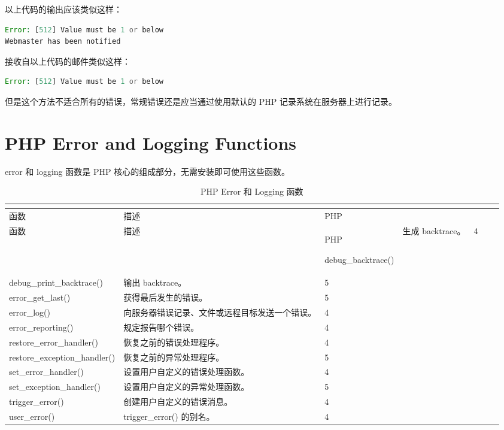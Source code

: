 以上代码的输出应该类似这样：

\begin{lstlisting}[language=PHP]
Error: [512] Value must be 1 or below
Webmaster has been notified
\end{lstlisting}


接收自以上代码的邮件类似这样：

\begin{lstlisting}[language=PHP]
Error: [512] Value must be 1 or below
\end{lstlisting}


但是这个方法不适合所有的错误，常规错误还是应当通过使用默认的 PHP 记录系统在服务器上进行记录。



\section{PHP Error and Logging Functions}

error 和 logging 函数是 PHP 核心的组成部分，无需安装即可使用这些函数。



\begin{longtable}{|m{120pt}|m{250pt}|m{20pt}|}
\tabularnewline\hline
函数	&描述	&PHP
\endhead

\caption{PHP Error 和 Logging 函数}\\
\hline
函数	&描述	&PHP
\endfirsthead

\endfoot

\endlastfoot

\hline
debug\_backtrace()			&生成 backtrace。	&4\\
\hline
debug\_print\_backtrace()	&输出 backtrace。	&5\\
\hline
error\_get\_last()			&获得最后发生的错误。&	5\\
\hline
error\_log()					&向服务器错误记录、文件或远程目标发送一个错误。	&4\\
\hline
error\_reporting()			&规定报告哪个错误。	&4\\
\hline
restore\_error\_handler()	&恢复之前的错误处理程序。	&4\\
\hline
restore\_exception\_handler()&	恢复之前的异常处理程序。	&5\\
\hline
set\_error\_handler()		&设置用户自定义的错误处理函数。	&4\\
\hline
set\_exception\_handler()	&设置用户自定义的异常处理函数。	&5\\
\hline
trigger\_error()				&创建用户自定义的错误消息。	&4\\
\hline
user\_error()				&trigger\_error() 的别名。	&4\\
\hline
\end{longtable}


